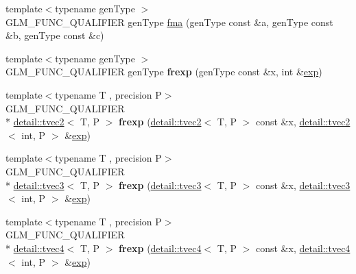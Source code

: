 \begin{DoxyCompactItemize}
{\footnotesize template$<$typename gen\-Type $>$ }\\G\-L\-M\-\_\-\-F\-U\-N\-C\-\_\-\-Q\-U\-A\-L\-I\-F\-I\-E\-R gen\-Type \hyperlink{group__core__func__common_gad0f444d4b81cc53c3b6edf5aa25078c2}{fma} (gen\-Type const \&a, gen\-Type const \&b, gen\-Type const \&c)
\item 
\hypertarget{namespaceglm_a3fab9fc606511c1751ff2173afccaa6e}{{\footnotesize template$<$typename gen\-Type $>$ }\\G\-L\-M\-\_\-\-F\-U\-N\-C\-\_\-\-Q\-U\-A\-L\-I\-F\-I\-E\-R gen\-Type {\bfseries frexp} (gen\-Type const \&x, int \&\hyperlink{group__core__func__exponential_gae154699ba6bda068d4b87cf9b987381f}{exp})}\label{namespaceglm_a3fab9fc606511c1751ff2173afccaa6e}

\item 
\hypertarget{namespaceglm_a555adf9521601a3823c9d573333c1360}{{\footnotesize template$<$typename T , precision P$>$ }\\G\-L\-M\-\_\-\-F\-U\-N\-C\-\_\-\-Q\-U\-A\-L\-I\-F\-I\-E\-R \\*
\hyperlink{structglm_1_1detail_1_1tvec2}{detail\-::tvec2}$<$ T, P $>$ {\bfseries frexp} (\hyperlink{structglm_1_1detail_1_1tvec2}{detail\-::tvec2}$<$ T, P $>$ const \&x, \hyperlink{structglm_1_1detail_1_1tvec2}{detail\-::tvec2}$<$ int, P $>$ \&\hyperlink{group__core__func__exponential_gae154699ba6bda068d4b87cf9b987381f}{exp})}\label{namespaceglm_a555adf9521601a3823c9d573333c1360}

\item 
\hypertarget{namespaceglm_afb702f1a288d4a5010b732b5bbbfaad6}{{\footnotesize template$<$typename T , precision P$>$ }\\G\-L\-M\-\_\-\-F\-U\-N\-C\-\_\-\-Q\-U\-A\-L\-I\-F\-I\-E\-R \\*
\hyperlink{structglm_1_1detail_1_1tvec3}{detail\-::tvec3}$<$ T, P $>$ {\bfseries frexp} (\hyperlink{structglm_1_1detail_1_1tvec3}{detail\-::tvec3}$<$ T, P $>$ const \&x, \hyperlink{structglm_1_1detail_1_1tvec3}{detail\-::tvec3}$<$ int, P $>$ \&\hyperlink{group__core__func__exponential_gae154699ba6bda068d4b87cf9b987381f}{exp})}\label{namespaceglm_afb702f1a288d4a5010b732b5bbbfaad6}

\item 
\hypertarget{namespaceglm_ad81e7dc1f395a13d442c19fa6b90b9d2}{{\footnotesize template$<$typename T , precision P$>$ }\\G\-L\-M\-\_\-\-F\-U\-N\-C\-\_\-\-Q\-U\-A\-L\-I\-F\-I\-E\-R \\*
\hyperlink{structglm_1_1detail_1_1tvec4}{detail\-::tvec4}$<$ T, P $>$ {\bfseries frexp} (\hyperlink{structglm_1_1detail_1_1tvec4}{detail\-::tvec4}$<$ T, P $>$ const \&x, \hyperlink{structglm_1_1detail_1_1tvec4}{detail\-::tvec4}$<$ int, P $>$ \&\hyperlink{group__core__func__exponential_gae154699ba6bda068d4b87cf9b987381f}{exp})}\label{namespaceglm_ad81e7dc1f395a13d442c19fa6b90b9d2}


\end{DoxyCompactItemize}
